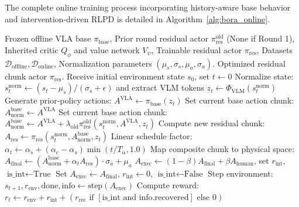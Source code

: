 \documentclass{article}
\begin{document}
The complete online training process incorporating history-aware base behavior and intervention-driven RLPD is detailed in Algorithm~\ref{alg:bora_online}.

\begin{algorithm*}[htbp]
\caption{BORA Online Residual Adaptation (Multi-Round Iteration)}\label{alg:bora_online}
\begin{algorithmic}[1]
\Require Frozen offline VLA base $\pi_{\text{base}}$, Prior round residual actor $\pi_{\text{res}}^{\text{old}}$ (None if Round 1), Inherited critic $Q_\phi$ and value network $V_{\psi}$, Trainable residual actor $\pi_{\text{res}}$, Datasets $\mathcal{D}_{\text{offline}}, \mathcal{D}_{\text{online}}$, Normalization parameters $(\mu_s, \sigma_s, \mu_a, \sigma_a)$.
\Ensure Optimized residual chunk actor $\pi_{\text{res}}$.
    \State Receive initial environment state $s_0$, set $t \gets 0$
        \State Normalize state: $s^{\text{norm}}_t \gets (s_t - \mu_s) / (\sigma_s + \epsilon)$ and extract VLM tokens $z_t \gets \Phi_{\text{VLM}}(s^{\text{norm}}_t)$
        \State Generate prior-policy actions: $A^{\text{VLA}} \gets \pi_{\text{base}}(z_t)$
         
            \State Set current base action chunk: $A^{\text{base}}_{\text{norm}} \gets A^{\text{VLA}}$
        \Else {}
            \State Set current base action chunk: $A^{\text{base}}_{\text{norm}} \gets A^{\text{VLA}} + \lambda_{\text{old}} \pi_{\text{res}}^{\text{old}}(s^{\text{norm}}_t, A^{\text{VLA}}, z_t)$
        \EndIf
        \State Compute new residual chunk: $A_{\text{res}} \gets \pi_{\text{res}}(s^{\text{norm}}_t, A^{\text{base}}_{\text{norm}}, z_t)$
        \State Linear schedule factor: $\alpha_t \gets \alpha_s + (\alpha_e - \alpha_s) \min(t/T_\alpha, 1.0)$
        \State Map composite chunk to physical space: $A_{\text{final}} \gets (A^{\text{base}}_{\text{norm}} + \alpha_t A_{\text{res}}) \cdot \sigma_a + \mu_a$
            \State $A_{\text{exec}} \gets (1-\beta)A_{\text{final}} + \beta A_{\text{human}}$, set $r_{\text{int}}$, $\text{is\_int} \gets \text{True}$
        \Else
            \State Set $A_{\text{exec}} \gets A_{\text{final}}$, $r_{\text{int}} \gets 0$, $\text{is\_int} \gets \text{False}$
        \EndIf
        \State Step environment: $s_{t+1}, r_{\text{env}}, \text{done}, \text{info} \gets \text{step}(A_{\text{exec}})$
        \State Compute reward: $r_t \gets r_{\text{env}} + r_{\text{int}} + (r_{\text{rec}} \text{ if } [\text{is\_int} \text{ and } \text{info.recovered}] \text{ else } 0)$

\end{algorithmic}
\end{algorithm*}
\end{document}
